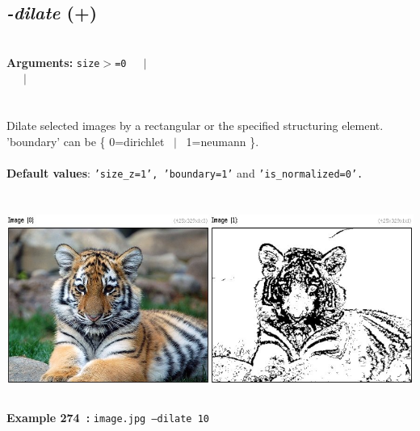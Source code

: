 \documentclass[a4paper,11pt,twoside]{book}
\begin{document}
\subsection{\emph{-dilate} (+)}\vspace*{-0.5em}
~\\\textbf{Arguments: } 
{\small \texttt{size$>$=0}}~~~$|$\\
~~~$|$\\
\\~\\
Dilate selected images by a rectangular or the specified structuring element.
~\\'boundary' can be \{ 0=dirichlet ~$|$~ 1=neumann \}.
~\\~\\\textbf{Default values}: {\small \texttt{'size\_z=1', 'boundary=1'} and \texttt{'is\_normalized=0'.}}
\begin{center}\includegraphics[keepaspectratio=true,height=7cm,width=\textwidth]{img/gmic_def274.jpg}\\
{\footnotesize \textbf{Example 274~:} \texttt{image.jpg --dilate 10}}
\end{center}
\end{document}
